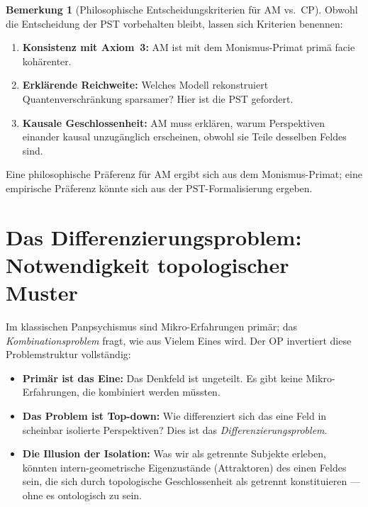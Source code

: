 \documentclass[11pt,a4paper]{article}
\theoremstyle{plain}
\theoremstyle{definition}
\newtheorem{remark}{Bemerkung}[section]
\begin{document}
\begin{remark}[Philosophische Entscheidungskriterien f\"{u}r AM vs.\ CP]
Obwohl die Entscheidung der PST vorbehalten bleibt, lassen sich Kriterien benennen:
\begin{enumerate}[label=(\alph*)]
  \item \textbf{Konsistenz mit Axiom~3:} AM ist mit dem Monismus-Primat prim\"{a} facie
        koh\"{a}renter.
  \item \textbf{Erkl\"{a}rende Reichweite:} Welches Modell rekonstruiert
        Quantenverschr\"{a}nkung sparsamer? Hier ist die PST gefordert.
  \item \textbf{Kausale Geschlossenheit:} AM muss erkl\"{a}ren, warum Perspektiven
        einander kausal unzug\"{a}nglich erscheinen, obwohl sie Teile desselben Feldes
        sind.
\end{enumerate}
Eine philosophische Pr\"{a}ferenz f\"{u}r AM ergibt sich aus dem Monismus-Primat; eine
empirische Pr\"{a}ferenz k\"{o}nnte sich aus der PST-Formalisierung ergeben.
\end{remark}

\section{Das Differenzierungsproblem: Notwendigkeit topologischer Muster}

Im klassischen Panpsychismus sind Mikro-Erfahrungen prim\"{a}r; das
\emph{Kombinationsproblem} fragt, wie aus Vielem Eines wird. Der OP invertiert diese
Problemstruktur vollst\"{a}ndig:

\begin{itemize}
  \item \textbf{Prim\"{a}r ist das Eine:} Das Denkfeld ist ungeteilt. Es gibt keine
        Mikro-Erfahrungen, die kombiniert werden m\"{u}ssten.
  \item \textbf{Das Problem ist Top-down:} Wie differenziert sich das eine Feld in
        scheinbar isolierte Perspektiven? Dies ist das \emph{Differenzierungsproblem}.
  \item \textbf{Die Illusion der Isolation:} Was wir als getrennte Subjekte erleben,
        k\"{o}nnten intern-geometrische Eigenzust\"{a}nde (Attraktoren) des einen Feldes
        sein, die sich durch topologische Geschlossenheit als \glqq{}getrennt\grqq{}
        konstituieren --- ohne es ontologisch zu sein.
\end{itemize}
\end{document}
